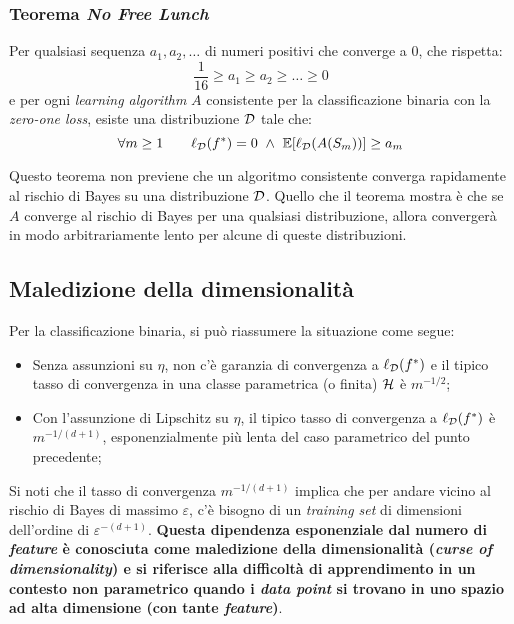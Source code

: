 \subsubsection{Teorema \textit{No Free Lunch}}
\begin{theorem} Per qualsiasi sequenza $a_1,a_2,\dots$
    di numeri positivi che converge a 0, che rispetta:
    $$ \frac{1}{16}\geq a_1\geq a_2\geq\dots\geq 0 $$
    e per ogni \textit{learning algorithm} $A$ consistente per la classificazione
    binaria con la \textit{zero-one loss}, esiste una distribuzione $\mathcal{D}$ tale che:
    $$ \forall m\geq 1 \qquad \ell_{\mathcal{D}}(f^*)=0 \ \wedge
    \ \mathbb{E}[\ell_{\mathcal{D}}(A(S_m))]\geq a_m $$
\end{theorem}
Questo teorema non previene che un algoritmo consistente converga rapidamente
al rischio di Bayes su una distribuzione $\mathcal{D}$. Quello che il teorema mostra è che
se $A$ converge al rischio di Bayes per una qualsiasi distribuzione, allora
convergerà in modo arbitrariamente lento per alcune di queste distribuzioni.

\subsection{Maledizione della dimensionalità}
Per la classificazione binaria, si può riassumere la situazione come segue:
\begin{itemize}
    \item Senza assunzioni su $\eta$, non c'è garanzia di convergenza a 
        $\ell_{\mathcal{D}}(f^*)$ e il tipico tasso di convergenza in una classe
        parametrica (o finita) $\mathcal{H}$ è $m^{-1/2}$;
    \item Con l'assunzione di Lipschitz su $\eta$, il tipico tasso di convergenza
        a $\ell_{\mathcal{D}}(f^*)$ è $m^{-1/(d+1)}$, esponenzialmente più lenta del caso
        parametrico del punto precedente;
\end{itemize}
Si noti che il tasso di convergenza $m^{-1/(d+1)}$ implica che per andare vicino
al rischio di Bayes di massimo $\varepsilon$, c'è bisogno di un \textit{training
set} di dimensioni dell'ordine di $\varepsilon^{-(d+1)}$. \textbf{Questa 
dipendenza esponenziale dal numero di \textit{feature} è conosciuta come
maledizione della dimensionalità (\textit{curse of dimensionality}) e si 
riferisce alla difficoltà di apprendimento in un contesto non parametrico quando
i \textit{data point} si trovano in uno spazio ad alta dimensione (con tante
\textit{feature})}.